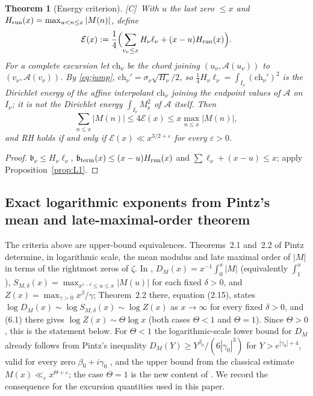 \documentclass[11pt]{amsart}
\numberwithin{equation}{section}
\theoremstyle{plain}
\newtheorem{theorem}{Theorem}[section]
\theoremstyle{definition}
\theoremstyle{remark}
\newcommand{\Ms}{M_{\mathrm{s}}}
\newcommand{\Anet}{\mathcal{A}}
\newcommand{\eps}{\varepsilon}
\newcommand{\En}{\mathcal{E}}
\newcommand{\tagC}{\textup{[C]}}
\begin{document}
\begin{theorem}[Energy criterion]
\label{thm:energy}
\tagC\ With $u$ the last zero $\le x$ and $H_{\rm run}(x)=\max_{u<n\le x}|M(n)|$,
define
\begin{equation}
\label{eq:energy_def}
  \En(x):=\frac14\Bigl(\sum_{v_\nu\le x}H_\nu\ell_\nu+(x-u)H_{\rm run}(x)\Bigr).
\end{equation}
For a complete excursion let $\mathrm{ch}_\nu$ be the chord joining
$(u_\nu,\Anet(u_\nu))$ to $(v_\nu,\Anet(v_\nu))$. By \eqref{eq:jump},
$\mathrm{ch}_\nu'=\sigma_\nu\sqrt{H_\nu}/2$, so $\tfrac14H_\nu\ell_\nu=\int_{I_\nu}(\mathrm{ch}_\nu')^2$
is the Dirichlet energy of the affine interpolant $\mathrm{ch}_\nu$ joining
the endpoint values of $\Anet$ on $I_\nu$; it is not the Dirichlet energy
$\int_{I_\nu}\Ms^2$ of $\Anet$ itself. Then
\begin{equation}
\label{eq:energy_sandwich}
  \sum_{n\le x}|M(n)|\le4\En(x)\le x\max_{n\le x}|M(n)|,
\end{equation}
and RH holds if and only if $\En(x)\ll x^{3/2+\eps}$ for every $\eps>0$.
\end{theorem}

\begin{proof}
$\mathfrak b_\nu\le H_\nu\ell_\nu$, $\mathfrak b_{\rm term}(x)\le(x-u)H_{\rm run}(x)$ and
$\sum\ell_\nu+(x-u)\le x$; apply Proposition~\ref{prop:L1}.
\end{proof}


\subsection{Exact logarithmic exponents from Pintz's mean and late-maximal-order theorem}
\label{subsec:pintz-exponents}

The criteria above are upper-bound equivalences.  Theorems~2.1 and~2.2 of
Pintz~\cite[Theorems~2.1--2.2, equations~(2.14)--(2.15)]{Pintz2026}
determine, in logarithmic scale, the mean modulus and late maximal order of
$|M|$ in terms of the rightmost zeros of $\zeta$. In \cite{Pintz2026}, $D_M(x)=x^{-1}\int_0^x|M|$ (equivalently $\int_1^x$),
$S_{M,\delta}(x)=\max_{x^{1-\delta}\le u\le x}|M(u)|$ for each fixed
$\delta>0$, and $Z(x)=\max_{\gamma>0}x^{\beta}/\gamma$; Theorem~2.2 there,
equation (2.15), states $\log D_M(x)\sim\log S_{M,\delta}(x)\sim\log Z(x)$ as
$x\to\infty$ for every fixed $\delta>0$, and (6.1) there gives
$\log Z(x)\sim\Theta\log x$ (both cases $\Theta<1$ and $\Theta=1$). Since
$\Theta>0$, this is the statement below.
For $\Theta<1$ the logarithmic-scale lower bound for $D_M$ already follows
from Pintz's inequality $D_M(Y)\ge Y^{\beta_0}/(6|\gamma_0|^3)$ for
$Y>e^{|\gamma_0|+4}$, valid for every zero $\beta_0+i\gamma_0$
\cite{Pintz1983}, and the upper bound from the classical estimate
$M(x)\ll_\eps x^{\Theta+\eps}$; the case $\Theta=1$ is the new content of
\cite{Pintz2026}.
We record the consequence for the excursion quantities used in this paper.
\end{document}
